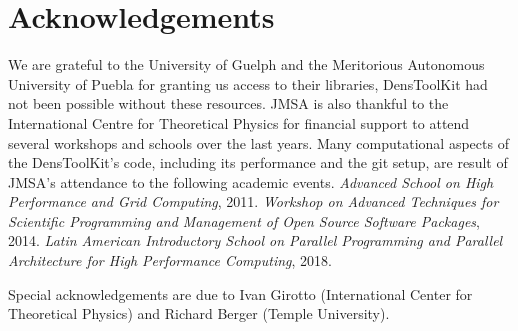 \documentclass[12pt]{book}
\newcommand{\DTK}{Dens\-Tool\-Kit}
\begin{document}
\newpage\thispagestyle{empty}
\phantom{asd}

\vspace{50mm}

\section*{Acknowledgements}

We are grateful to the University of Guelph and the Meritorious
Autonomous University of Puebla for granting us access to their libraries, \DTK{} 
had not been possible without these resources.
JMSA is also thankful to the International Centre for 
Theoretical Physics for financial support to attend several workshops and
schools over the last years. Many computational aspects of the \DTK's code, including its performance and the 
git setup, are result of JMSA's attendance to the following academic events.
\textit{Advanced School on High Performance 
and Grid Computing}, 2011. \textit{Workshop on Advanced Techniques for Scientific 
Programming and Management of Open Source Software Packages}, 2014.
\textit{Latin American Introductory School on Parallel Programming and
Parallel Architecture for High Performance Computing}, 2018.

Special acknowledgements are due to Ivan Girotto (International Center for
Theoretical Physics) and Richard Berger (Temple University).

\newpage\thispagestyle{empty}
\phantom{asdf}

\tableofcontents


\mainmatter





%
%








\lstset{language=bash%
,basicstyle=\footnotesize\ttfamily%
}










\appendix



\end{document}
